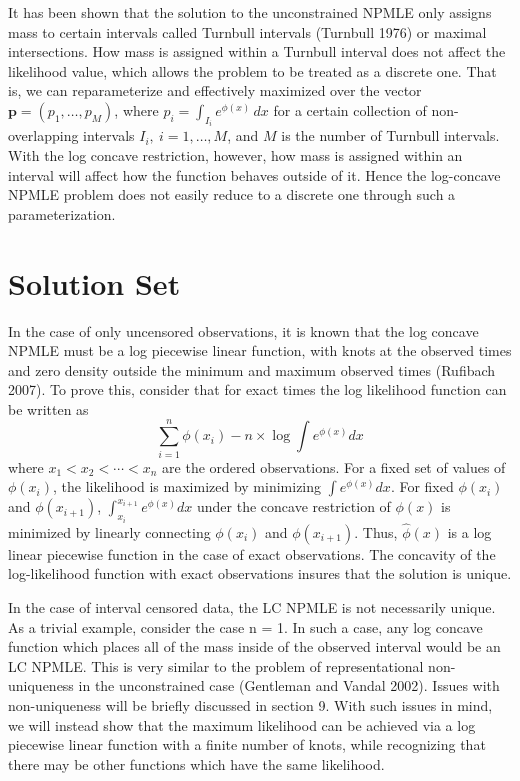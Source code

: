 \documentclass[12pt]{article}
\numberwithin{equation}{section}
\begin{document}
	It has been shown that the solution to the unconstrained NPMLE only assigns mass to certain intervals called Turnbull intervals (Turnbull 1976) or maximal intersections. How mass is assigned within a Turnbull interval does not affect the likelihood value, which allows the problem to be treated as a discrete one. That is, we can reparameterize and effectively maximized over the vector $\mathbf{p}=(p_1, \ldots, p_M)$, where $p_i = \int_{I_i} e^ { \phi(x) } \,dx$ for a certain collection of non-overlapping intervals $I_i,\ i=1,\ldots, M$, and $M$ is the number of Turnbull intervals. With the log concave restriction, however, how mass is assigned within an interval will affect how the function behaves outside of it.  Hence the log-concave NPMLE problem does not easily reduce to a discrete one through such a parameterization.
		
		
{\section{Solution Set}}


	In the case of only uncensored observations, it is known that the log concave NPMLE must be a log piecewise linear function, with knots at the observed times and zero density outside the minimum and maximum observed times (Rufibach 2007). To prove this, consider that for exact times the log likelihood function can be written as	
	\[ \displaystyle \sum_{i = 1}^n \phi(x_i) - n \times \log \int e^{\phi(x)} dx
	\]
where $x_1<x_2<\cdots<x_n$ are the ordered observations. For a fixed set of values of $\phi(x_i)$, the likelihood is maximized by minimizing $\int e^{\phi(x)} dx$. For fixed $\phi(x_i)$ and $\phi(x_{i+1})$, $\int_{x_i}^{x_{i+1}} e^{\phi(x)}dx$ under the concave restriction of $\phi(x)$ is minimized by linearly connecting $\phi(x_i)$ and $\phi(x_{i+1})$. Thus, $\hat \phi(x)$ is a log linear piecewise function in the case of exact observations. The concavity of the log-likelihood function with exact observations insures that the solution is unique.
		
	In the case of interval censored data, the LC NPMLE is not necessarily unique. As a trivial example, consider the case n = 1. In such a case, any log concave function which places all of the mass inside of the observed interval would be an LC NPMLE. This is very similar to the problem of representational non-uniqueness in the unconstrained case (Gentleman and Vandal 2002). Issues with non-uniqueness will be briefly discussed in section 9. With such issues in mind, we will instead show that the maximum likelihood can be achieved via a log piecewise linear function with a finite number of knots, while recognizing that there may be other functions which have the same likelihood. 
	
\end{document}
